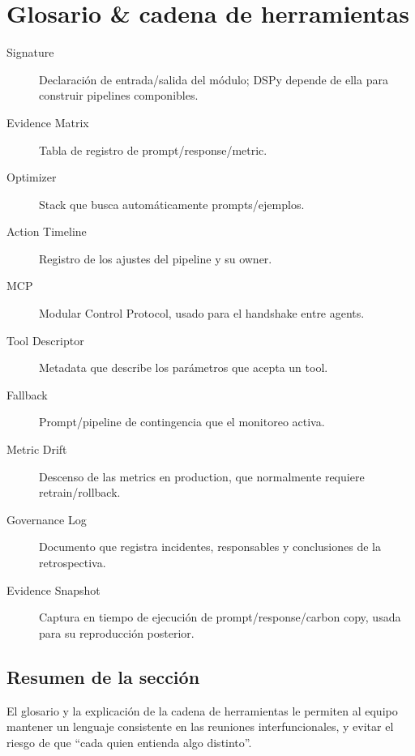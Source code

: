 \section{Glosario \& cadena de herramientas}

\begin{description}
    \item[Signature] Declaración de entrada/salida del módulo; DSPy depende de ella para construir pipelines componibles.
    \item[Evidence Matrix] Tabla de registro de prompt/response/metric.
    \item[Optimizer] Stack que busca automáticamente prompts/ejemplos.
    \item[Action Timeline] Registro de los ajustes del pipeline y su owner.
    \item[MCP] Modular Control Protocol, usado para el handshake entre agents.
    \item[Tool Descriptor] Metadata que describe los parámetros que acepta un tool.
    \item[Fallback] Prompt/pipeline de contingencia que el monitoreo activa.
    \item[Metric Drift] Descenso de las metrics en production, que normalmente requiere retrain/rollback.
    \item[Governance Log] Documento que registra incidentes, responsables y conclusiones de la retrospectiva.
    \item[Evidence Snapshot] Captura en tiempo de ejecución de prompt/response/carbon copy, usada para su reproducción posterior.
\end{description}

\subsection{Resumen de la sección}

El glosario y la explicación de la cadena de herramientas le permiten al equipo mantener un lenguaje consistente en las reuniones interfuncionales, y evitar el riesgo de que ``cada quien entienda algo distinto''.
